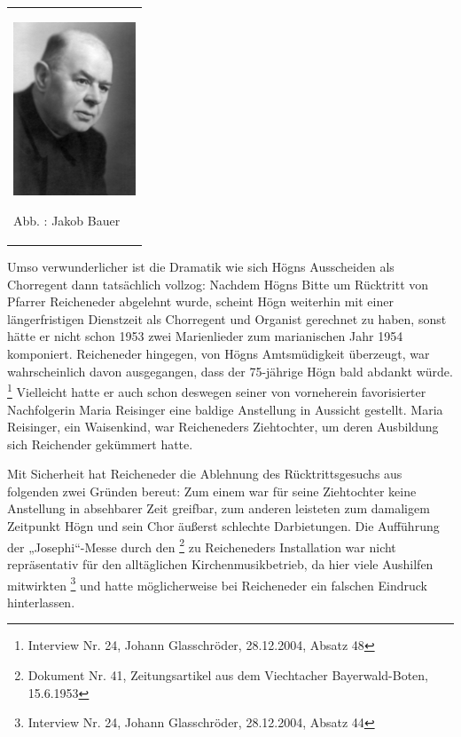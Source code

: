 \begin{center}
\begin{minipage}{4.032cm}
\begin{flushleft}
\tablefirsthead{}
\tablehead{}
\tabletail{}
\tablelasttail{}
\begin{supertabular}{m{3.832cm}}

\includegraphics[width=3.651cm,height=5.177cm]{pictures/zulassungsarbeit-img046.jpg}

Abb. : Jakob Bauer\\
\end{supertabular}
\end{flushleft}
\end{minipage}
\end{center}
Umso verwunderlicher ist die Dramatik wie sich Högns Ausscheiden als
Chorregent dann tatsächlich vollzog: Nachdem Högns Bitte um Rücktritt
von Pfarrer Reicheneder abgelehnt wurde, scheint Högn weiterhin mit
einer längerfristigen Dienstzeit als Chorregent und Organist gerechnet
zu haben, sonst hätte er nicht schon 1953 zwei Marienlieder zum
marianischen Jahr 1954 komponiert. Reicheneder hingegen, von Högns
Amtsmüdigkeit überzeugt, war wahrscheinlich davon ausgegangen, dass der
75-jährige Högn bald abdankt würde. \footnote{Interview Nr. 24, Johann
Glasschröder, 28.12.2004, Absatz 48} Vielleicht hatte er auch schon
deswegen seiner von vorneherein favorisierter Nachfolgerin Maria
Reisinger eine baldige Anstellung in Aussicht gestellt. Maria
Reisinger, ein Waisenkind, war Reicheneders Ziehtochter, um deren
Ausbildung sich Reichender gekümmert hatte.

Mit Sicherheit hat Reicheneder die Ablehnung des Rücktrittsgesuchs aus
folgenden zwei Gründen bereut: Zum einem war für seine Ziehtochter
keine Anstellung in absehbarer Zeit greifbar, zum anderen leisteten zum
damaligem Zeitpunkt Högn und sein Chor äußerst schlechte Darbietungen.
Die Aufführung der „Josephi“-Messe durch den
\footnote{Dokument Nr. 41, Zeitungsartikel aus dem Viechtacher
Bayerwald-Boten, 15.6.1953} zu Reicheneders Installation war nicht
repräsentativ für den alltäglichen Kirchenmusikbetrieb, da hier viele
Aushilfen mitwirkten \footnote{Interview Nr. 24, Johann Glasschröder,
28.12.2004, Absatz 44} und hatte möglicherweise bei Reicheneder ein
falschen Eindruck hinterlassen.

